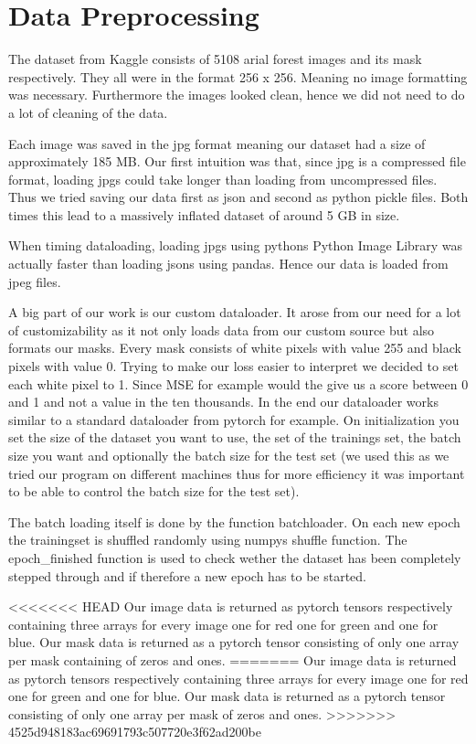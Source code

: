 \section{Data Preprocessing}
The dataset from Kaggle consists of 5108 arial forest images and its mask
respectively. They all were in the format 256 x 256. Meaning no image formatting was necessary.
Furthermore the images looked clean, hence we did not need to do
a lot of cleaning of the data.

Each image was saved in the jpg format meaning our
dataset had a size of approximately 185 MB.
Our first intuition was that, since jpg is a
compressed file format, loading jpgs could take longer
than loading from uncompressed files. Thus we tried saving our
data first as json and second as python pickle files.
Both times this lead to a massively inflated dataset of
around 5 GB in size.

When timing dataloading, loading jpgs using pythons
Python Image Library was actually faster than loading jsons
using pandas. Hence our data is loaded from jpeg files.

A big part of our work is our custom dataloader.
It arose from our need for a lot of customizability as it not
only loads data from our custom source but also formats our masks.
 Every mask consists of white pixels with value 255 and black
 pixels with value 0. Trying to make our loss easier to interpret
 we decided to set each white pixel to 1. Since MSE for example would
 the give us a score between 0 and 1 and not a value in the ten thousands.
In the end our dataloader works similar to a standard dataloader
from pytorch for example.
On initialization you set the size of the dataset you want to
use, the set of the trainings set, the batch size you want and
optionally the batch size for the test set
(we used this as we tried our program on different machines thus for
more efficiency it was important to be able to control the batch size
for the test set).

The batch loading itself is done by the function batchloader.
On each new epoch the trainingset is shuffled randomly using numpys
shuffle function. The epoch\_finished function is used to check wether
 the dataset has been completely stepped through and if therefore a new
 epoch has to be started.

<<<<<<< HEAD
Our image data is returned as pytorch tensors respectively containing three arrays for every image one for red one for green and one for blue. Our mask data is returned as a pytorch tensor consisting of only one array per mask containing of zeros and ones.
=======
Our image data is returned as pytorch tensors respectively containing
three arrays for every image one for red one for green and one for blue.
 Our mask data is returned as a pytorch tensor consisting of only one
 array per mask of zeros and ones.
>>>>>>> 4525d948183ac69691793c507720e3f62ad200be

